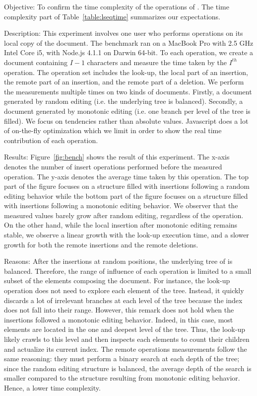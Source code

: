 \begin{asparadesc}
\item [Objective:] To confirm the time complexity of the operations of
  \LSEQ. The time complexity part of Table~\ref{table:lseqtime}
  summarizes our expectations.
\item [Description:] This experiment involves one user who performs operations
  on its local copy of the document. The benchmark ran on a MacBook Pro with 2.5
  GHz Intel Core i5, with Node.js 4.1.1 on Darwin 64-bit. To each operation, we
  create a document containing $I-1$ characters and measure the time taken by
  the $I^{th}$ operation. The operation set includes the look-up, the local part
  of an insertion, the remote part of an insertion, and the remote part of a
  deletion. We perform the measurements multiple times on two kinds of
  documents. Firstly, a document generated by random editing (i.e. the
  underlying \LSEQ tree is balanced). Secondly, a document generated by
  monotonic editing (i.e. one branch per level of the \LSEQ tree is filled).  We
  focus on tendencies rather than absolute values. Javascript does a lot of
  on-the-fly optimization which we limit in order to show the real time
  contribution of each operation.
\item [Results:] Figure~\ref{fig:bench} shows the result of this experiment. The
  x-axis denotes the number of insert operations performed before the measured
  operation. The y-axis denotes the average time taken by this operation. The
  top part of the figure focuses on a structure filled with insertions following
  a random editing behavior while the bottom part of the figure focuses on a
  structure filled with insertions following a monotonic editing behavior. We
  observer that the measured values barely grow after random editing, regardless
  of the operation. On the other hand, while the local insertion after monotonic
  editing remains stable, we observe a linear growth with the look-up execution
  time, and a slower growth for both the remote insertions and the remote
  deletions.
\item [Reasons:] After the insertions at random positions, the underlying tree
  of \LSEQ is balanced. Therefore, the range of influence of each operation is
  limited to a small subset of the elements composing the document. For
  instance, the look-up operation does not need to explore each element of the
  tree. Instead, it quickly discards a lot of irrelevant branches at each level
  of the tree because the index does not fall into their range. However, this
  remark does not hold when the insertions followed a monotonic editing
  behavior. Indeed, in this case, most elements are located in the one and
  deepest level of the tree. Thus, the look-up likely crawls to this level and
  then inspects each elements to count their children and actualize its current
  index. The remote operations measurements follow the same reasoning: they must
  perform a binary search at each depth of the tree; since the random editing
  structure is balanced, the average depth of the search is smaller compared to
  the structure resulting from monotonic editing behavior. Hence, a lower time
  complexity.
\end{asparadesc}

